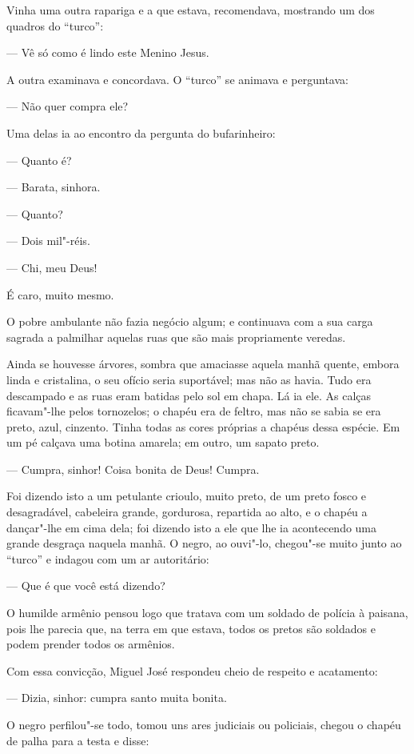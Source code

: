 Vinha uma outra rapariga e a que estava, recomendava, mostrando um dos
quadros do ``turco'':

--- Vê só como é lindo este Menino Jesus.

A outra examinava e concordava. O ``turco'' se animava e perguntava:

--- Não quer compra ele?

Uma delas ia ao encontro da pergunta do bufarinheiro:

--- Quanto é?

--- Barata, sinhora.

--- Quanto?

--- Dois mil"-réis.

--- Chi, meu Deus!

É caro, muito mesmo.

O pobre ambulante não fazia negócio algum; e continuava com a sua carga
sagrada a palmilhar aquelas ruas que são mais propriamente veredas.

Ainda se houvesse árvores, sombra que amaciasse aquela manhã quente,
embora linda e cristalina, o seu ofício seria suportável; mas não as
havia. Tudo era descampado e as ruas eram batidas pelo sol em chapa. Lá
ia ele. As calças ficavam"-lhe pelos tornozelos; o chapéu era de feltro,
mas não se sabia se era preto, azul, cinzento. Tinha todas as cores
próprias a chapéus dessa espécie. Em um pé calçava uma botina amarela;
em outro, um sapato preto.

--- Cumpra, sinhor! Coisa bonita de Deus! Cumpra.

Foi dizendo isto a um petulante crioulo, muito preto, de um preto fosco
e desagradável, cabeleira grande, gordurosa, repartida ao alto, e o
chapéu a dançar"-lhe em cima dela; foi dizendo isto a ele que lhe ia
acontecendo uma grande desgraça naquela manhã. O negro, ao ouvi"-lo,
chegou"-se muito junto ao ``turco'' e indagou com um ar autoritário:

--- Que é que você está dizendo?

O humilde armênio pensou logo que tratava com um soldado de polícia à
paisana, pois lhe parecia que, na terra em que estava, todos os pretos
são soldados e podem prender todos os armênios.

Com essa convicção, Miguel José respondeu cheio de respeito e
acatamento:

--- Dizia, sinhor: cumpra santo muita bonita.

O negro perfilou"-se todo, tomou uns ares judiciais ou policiais, chegou
o chapéu de palha para a testa e disse:

